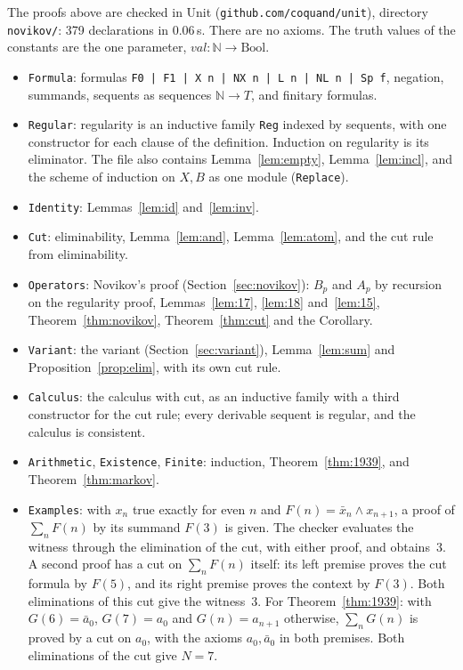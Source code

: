 \documentclass[11pt]{amsart}
\theoremstyle{definition}
\theoremstyle{remark}
\newcommand{\nx}{\bar x}
\newcommand{\N}{\mathbb{N}}
\begin{document}
The proofs above are checked in Unit (\texttt{github.com/coquand/unit}),
directory \texttt{novikov/}: 379 declarations in 0.06\,s. There are no
axioms. The truth values of the constants are the one parameter,
$\mathit{val}:\N\to\mathrm{Bool}$.
\begin{itemize}
\item \texttt{Formula}: formulas
  \texttt{F0 | F1 | X n | NX n | L n | NL n | Sp f}, negation,
  summands, sequents as sequences $\N\to T$, and finitary formulas.
\item \texttt{Regular}: regularity is an inductive family
  \texttt{Reg} indexed by sequents, with one constructor for each clause
  of the definition. Induction on regularity is its eliminator. The file
  also contains Lemma~\ref{lem:empty}, Lemma~\ref{lem:incl},
  and the scheme of induction on $X,B$ as one module (\texttt{Replace}).
\item \texttt{Identity}: Lemmas~\ref{lem:id} and~\ref{lem:inv}.
\item \texttt{Cut}: eliminability, Lemma~\ref{lem:and},
  Lemma~\ref{lem:atom}, and the cut rule from eliminability.
\item \texttt{Operators}: Novikov's proof (Section~\ref{sec:novikov}):
  $B_p$ and $A_p$ by recursion on the regularity proof,
  Lemmas~\ref{lem:17}, \ref{lem:18} and~\ref{lem:15},
  Theorem~\ref{thm:novikov}, Theorem~\ref{thm:cut} and the Corollary.
\item \texttt{Variant}: the variant (Section~\ref{sec:variant}),
  Lemma~\ref{lem:sum} and Proposition~\ref{prop:elim}, with its own cut
  rule.
\item \texttt{Calculus}: the calculus with cut, as an inductive family
  with a third constructor for the cut rule; every derivable sequent is
  regular, and the calculus is consistent.
\item \texttt{Arithmetic}, \texttt{Existence}, \texttt{Finite}: induction,
  Theorem~\ref{thm:1939}, and Theorem~\ref{thm:markov}.
\item \texttt{Examples}: with $x_n$ true exactly for even $n$ and
  $F(n)=\nx_n\wedge x_{n+1}$, a proof of $\sum_nF(n)$ by its summand $F(3)$
  is given. The checker evaluates the witness through the elimination of
  the cut, with either proof, and obtains~$3$. A second proof has a
  cut on $\sum_nF(n)$ itself: its left premise proves the cut formula by
  $F(5)$, and its right premise proves the context by $F(3)$. Both
  eliminations of this cut give the witness~$3$. For
  Theorem~\ref{thm:1939}: with $G(6)=\bar a_0$, $G(7)=a_0$ and
  $G(n)=a_{n+1}$ otherwise, $\sum_nG(n)$ is proved by a cut on $a_0$, with
  the axioms $a_0,\bar a_0$ in both premises. Both eliminations of the cut
  give $N=7$.
\end{itemize}
\end{document}
